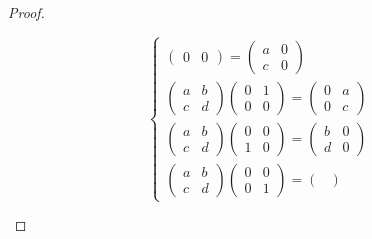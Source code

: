 \documentclass[class=nhvh-linear-algebra,crop=false]{standalone}
\begin{document}
\begin{proof}
\begin{enumerate}[label = (\alph*)]
\[\begin{cases}
\begin{pmatrix}
                          0 & 0
                      \end{pmatrix}=
                      \begin{pmatrix}
                          a & 0 \\
                          c & 0
                      \end{pmatrix} \\
                      \begin{pmatrix}
                          a & b \\
                          c & d
                      \end{pmatrix}
                      \begin{pmatrix}
                          0 & 1 \\
                          0 & 0
                      \end{pmatrix}=
                      \begin{pmatrix}
                          0 & a \\
                          0 & c
                      \end{pmatrix} \\
                      \begin{pmatrix}
                          a & b \\
                          c & d
                      \end{pmatrix}
                      \begin{pmatrix}
                          0 & 0 \\
                          1 & 0
                      \end{pmatrix}=
                      \begin{pmatrix}
                          b & 0 \\
                          d & 0
                      \end{pmatrix} \\
                      \begin{pmatrix}
                          a & b \\
                          c & d
                      \end{pmatrix}
                      \begin{pmatrix}
                          0 & 0 \\
                          0 & 1
                      \end{pmatrix}=
                      \begin{pmatrix}

\end{pmatrix}
\end{cases}\]
\end{enumerate}
\end{proof}
\end{document}

